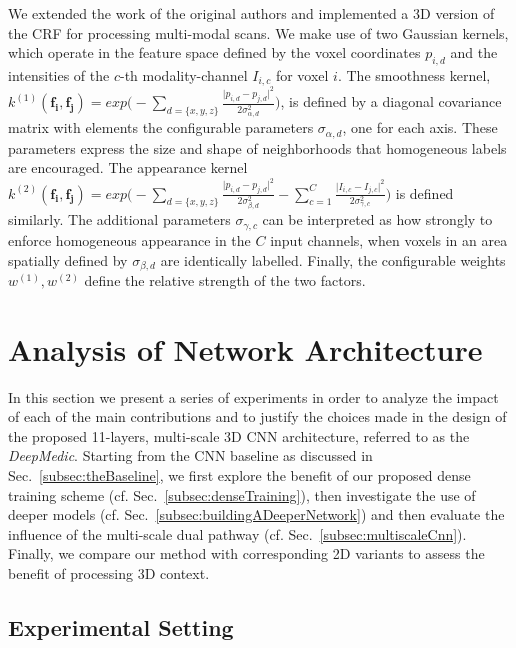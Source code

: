 \documentclass[preprint,authoryear,12pt]{elsarticle}
\begin{document}
We extended the work of the original authors and implemented a 3D version of the CRF for processing multi-modal scans. We make use of two Gaussian kernels, which operate in the feature space defined by the voxel coordinates $p_{i,d}$ and the intensities of the $c$-th modality-channel $I_{i,c}$ for voxel $i$. The smoothness kernel, $k^{(1)}(\mathbf{f_i}, \mathbf{f_j}) = exp\Big(- \sum_{d=\{x,y,z\}}{ \frac{\vert p_{i,d} - p_{j,d} \vert ^2}{2\sigma_{\alpha, d}^2} } \Big)$, is defined by a diagonal covariance matrix with elements the configurable parameters $\sigma_{\alpha, d}$, one for each axis. These parameters express the size and shape of neighborhoods that homogeneous labels are encouraged. The appearance kernel $ k^{(2)}(\mathbf{f_i},\mathbf{f_j}) = exp \Big( - \sum_{d=\{x,y,z\}}{ \frac{\vert p_{i,d}-p_{j,d} \vert ^2}{2\sigma_{\beta,d}^2} } - \sum_{c=1}^{C}{ \frac{\vert I_{i,c} - I_{j,c} \vert ^2}{2\sigma_{\gamma,c}^2} } \Big) $ is defined similarly. The additional parameters $\sigma_{\gamma,c}$ can be interpreted as how strongly to enforce homogeneous appearance in the $C$ input channels, when voxels in an area spatially defined by $\sigma_{\beta,d}$ are identically labelled. Finally, the configurable weights $w^{(1)},w^{(2)}$ define the relative strength of the two factors.

 





\section{Analysis of Network Architecture}
\label{sec:vaOfNetArch}

In this section we present a series of experiments in order to analyze the impact of each of the main contributions and to justify the choices made in the design of the proposed 11-layers, multi-scale 3D CNN architecture, referred to as the \textit{DeepMedic}. Starting from the CNN baseline as discussed in Sec.~\ref{subsec:theBaseline}, we first explore the benefit of our proposed dense training scheme (cf. Sec.~\ref{subsec:denseTraining}), then investigate the use of deeper models (cf. Sec.~\ref{subsec:buildingADeeperNetwork}) and then evaluate the influence of the multi-scale dual pathway (cf. Sec.~\ref{subsec:multiscaleCnn}). Finally, we compare our method with corresponding 2D variants to assess the benefit of processing 3D context.

\subsection{Experimental Setting}
\label{subsec:experimentSetting}
\end{document}
